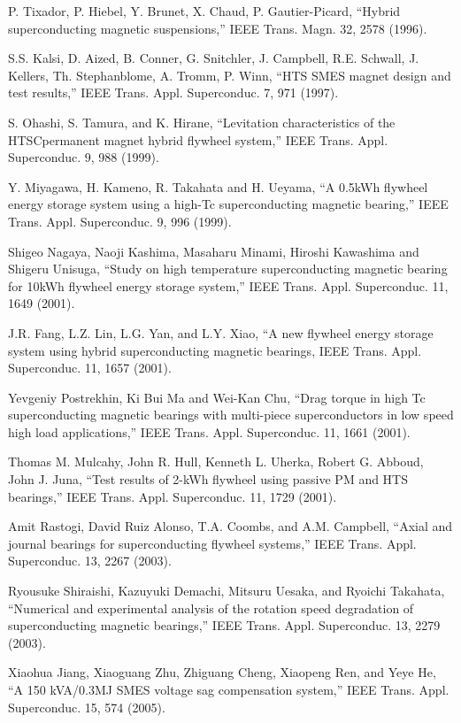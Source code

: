 \noindent [9.82] P. Tixador, P. Hiebel, Y. Brunet, X. Chaud, P. Gautier-Picard, ``Hybrid superconducting
magnetic suspensions,” IEEE Trans. Magn. 32, 2578 (1996).

\noindent [9.83] S.S. Kalsi, D. Aized, B. Conner, G. Snitchler, J. Campbell, R.E. Schwall, J. Kellers,
Th. Stephanblome, A. Tromm, P. Winn, ``HTS SMES magnet design and test
results,” IEEE Trans. Appl. Superconduc. 7, 971 (1997).

\noindent [9.84] S. Ohashi, S. Tamura, and K. Hirane, ``Levitation characteristics of the HTSCpermanent
magnet hybrid flywheel system,” IEEE Trans. Appl. Superconduc. 9,
988 (1999).

\noindent [9.85] Y. Miyagawa, H. Kameno, R. Takahata and H. Ueyama, ``A 0.5kWh flywheel
energy storage system using a high-Tc superconducting magnetic bearing,” IEEE
Trans. Appl. Superconduc. 9, 996 (1999).

\noindent [9.86] Shigeo Nagaya, Naoji Kashima, Masaharu Minami, Hiroshi Kawashima and
Shigeru Unisuga, ``Study on high temperature superconducting magnetic bearing
for 10kWh flywheel energy storage system,” IEEE Trans. Appl. Superconduc.
11, 1649 (2001).

\noindent [9.87] J.R. Fang, L.Z. Lin, L.G. Yan, and L.Y. Xiao, ``A new flywheel energy storage
system using hybrid superconducting magnetic bearings, IEEE Trans. Appl. Superconduc.
11, 1657 (2001).

\noindent [9.88] Yevgeniy Postrekhin, Ki Bui Ma and Wei-Kan Chu, ``Drag torque in high Tc
superconducting magnetic bearings with multi-piece superconductors in low speed
high load applications,” IEEE Trans. Appl. Superconduc. 11, 1661 (2001).

\noindent [9.89] Thomas M. Mulcahy, John R. Hull, Kenneth L. Uherka, Robert G. Abboud, John
J. Juna, ``Test results of 2-kWh flywheel using passive PM and HTS bearings,”
IEEE Trans. Appl. Superconduc. 11, 1729 (2001).

\noindent [9.90] Amit Rastogi, David Ruiz Alonso, T.A. Coombs, and A.M. Campbell, ``Axial and
journal bearings for superconducting flywheel systems,” IEEE Trans. Appl. Superconduc. 13, 2267 (2003).

\noindent [9.91] Ryousuke Shiraishi, Kazuyuki Demachi, Mitsuru Uesaka, and Ryoichi Takahata,
``Numerical and experimental analysis of the rotation speed degradation of superconducting
magnetic bearings,” IEEE Trans. Appl. Superconduc. 13, 2279 (2003).

\noindent [9.92] Xiaohua Jiang, Xiaoguang Zhu, Zhiguang Cheng, Xiaopeng Ren, and Yeye He,
``A 150 kVA/0.3MJ SMES voltage sag compensation system,” IEEE Trans. Appl.
Superconduc. 15, 574 (2005).

